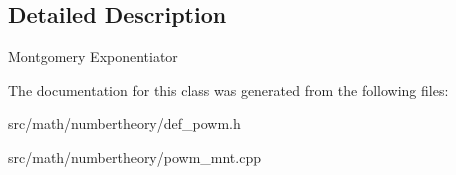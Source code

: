 \subsection{Detailed Description}
Montgomery Exponentiator 

The documentation for this class was generated from the following files\-:\begin{DoxyCompactItemize}
\item 
src/math/numbertheory/def\-\_\-powm.\-h\item 
src/math/numbertheory/powm\-\_\-mnt.\-cpp\end{DoxyCompactItemize}
